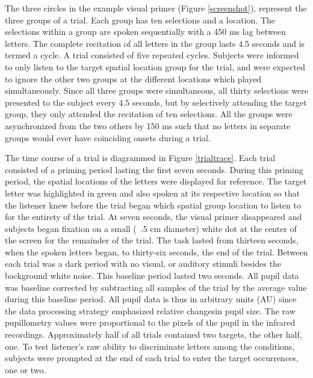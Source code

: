 \documentclass[10pt]{article}
\begin{document}
The three circles in the example visual primer (Figure
\ref{screenshot}), represent the three groups of a trial.
Each group has ten selections and a location.  The selections
within a group are spoken sequentially with a 450 ms lag
between letters.  The complete recitation of all letters in
the group lasts 4.5 seconds and is termed a cycle.  A trial
consisted of five repeated cycles. Subjects were informed to
only listen to the target spatial location group for the
trial, and were expected to ignore the other two groups
at the different locations which played simultaneously. Since
all three groups were simultaneous, all thirty selections were
presented to the subject every 4.5 seconds, but by
selectively attending the target group, they only
attended the recitation of ten selections. All the groups
were asynchronized from the two others by 150 ms such that no
letters in separate groups would ever have coinciding onsets during a trial.

The time course of a trial is diagrammed in Figure
\ref{trialtrace}.  Each trial consisted of a priming period
lasting the first seven seconds.  During this priming period,
the spatial locations of the letters were displayed for
reference.  The target letter was highlighted in green and
also spoken at its respective location so that the listener
knew before the trial began which spatial group location to
listen to for the entirety of the trial. At seven seconds, the
visual primer disappeared and subjects began fixation on a
small (~.5 cm diameter) white dot at the center of the screen for the remainder
of the trial.  The task lasted from thirteen seconds, when the
spoken letters began, to thirty-six seconds, the end of the
trial.  Between each trial was a dark period with no visual,
or auditory stimuli besides the background white noise. This
baseline period 
lasted two seconds.  All pupil data was baseline
corrected by subtracting all samples of the trial by the
average value during this baseline period.  All pupil data is
thus in arbitrary units (AU) since the data processing
strategy emphasized relative changesin pupil size.  The raw
pupillometry values were proportional to the
pixels of the pupil in the infrared
recordings.  Approximately half of all trials contained two
targets, the other half, one. To test listener's raw ability
to discriminate letters among the conditions, subjects were
prompted at the end of each trial to enter the target
occurrences, one or two. 
\end{document}
